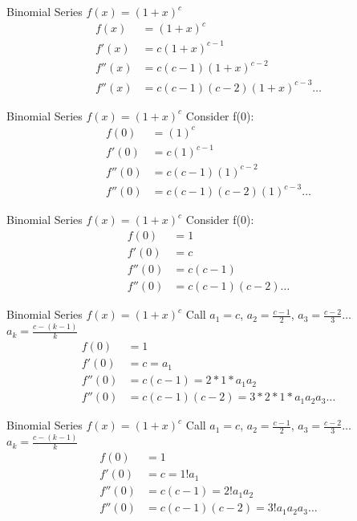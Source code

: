 \documentclass[aspectratio=169]{beamer}
\numberwithin{equation}{section}
\begin{document}
\begin{frame}{Binomial Series $f(x)=(1+x)^c$}
\begin{align*}
f(x)&=(1+x)^c\\
f'(x)&=c(1+x)^{c-1}\\
f''(x)&=c(c-1)(1+x)^{c-2}\\
f''(x)&=c(c-1)(c-2)(1+x)^{c-3}
\ldots
\end{align*}
\end{frame}


\begin{frame}{Binomial Series $f(x)=(1+x)^c$}
Consider f(0):
\begin{align*}
f(0)&=(1)^c\\
f'(0)&=c(1)^{c-1}\\
f''(0)&=c(c-1)(1)^{c-2}\\
f''(0)&=c(c-1)(c-2)(1)^{c-3}
\ldots
\end{align*}
\end{frame}


\begin{frame}{Binomial Series $f(x)=(1+x)^c$}
Consider f(0):
\begin{align*}
f(0)&=1\\
f'(0)&=c\\
f''(0)&=c(c-1)\\
f''(0)&=c(c-1)(c-2)
\ldots
\end{align*}
\end{frame}


\begin{frame}{Binomial Series $f(x)=(1+x)^c$}
Call $a_1=c$, $a_2=\frac{c-1}{2}$, $a_3=\frac{c-2}{3}\ldots$ $a_k=\frac{c-(k-1)}{k}$\pause
\begin{align*}
f(0)&=1\\
f'(0)&=c=a_1\\
f''(0)&=c(c-1)=2*1*a_1a_2\\
f''(0)&=c(c-1)(c-2)=3*2*1*a_1a_2a_3
\ldots
\end{align*}

\end{frame}

\begin{frame}{Binomial Series $f(x)=(1+x)^c$}
Call $a_1=c$, $a_2=\frac{c-1}{2}$, $a_3=\frac{c-2}{3}\ldots$ $a_k=\frac{c-(k-1)}{k}$\pause
\begin{align*}
f(0)&=1\\
f'(0)&=c=1! a_1\\
f''(0)&=c(c-1)=2! a_1a_2\\
f''(0)&=c(c-1)(c-2)=3!a_1a_2a_3
\ldots
\end{align*}
\end{frame}
\end{document}
